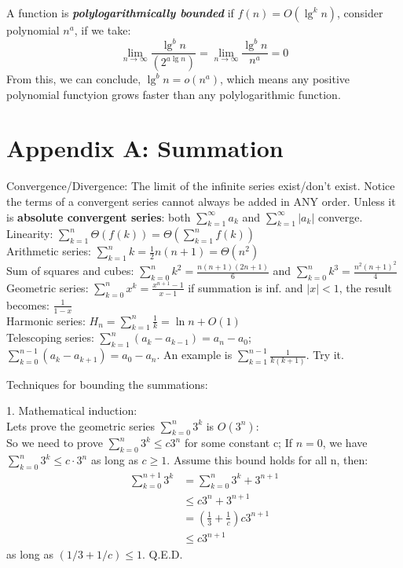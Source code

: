 \documentclass{article}
\begin{document}
A function is \textbf{\textit{polylogarithmically bounded}} if $f(n) = O(\lg^k n)$, consider polynomial $n^a$, if we take:
\[\lim_{n\to\infty}\frac{\lg^b n}{(2^{a\lg n})} = \lim_{n\to\infty}\frac{\lg^b n}{n^a} = 0\]
From this, we can conclude, $\lg^b n = o(n^a)$, which means any positive polynomial functyion grows faster than any polylogarithmic function.

\section*{Appendix A: Summation}
Convergence/Divergence: The limit of the infinite series exist/don't exist. Notice the terms of a convergent series cannot always be added in ANY order. 
Unless it is \textbf{absolute convergent series}: both $\sum_{k=1}^{\infty}a_k$ and $\sum_{k=1}^{\infty}|a_k|$ converge.\\

Linearity:  $\sum_{k=1}^{n}\Theta(f(k)) = \Theta(\sum_{k=1}^{n}f(k))$\\

Arithmetic series: $\sum_{k=1}^{n}k = \frac{1}{2} n(n+1) = \Theta(n^2)$\\

Sum of squares and cubes: $\sum_{k=0}^{n}k^2 = \frac{n(n+1)(2n+1)}{6}$ and $\sum_{k=0}^{n}k^3 = \frac{n^2(n+1)^2}{4}$\\

Geometric series: $\sum_{k=0}^{n}x^k = \frac{x^{n+1} -1}{x-1}$ if summation is inf. and $|x| < 1$, the result becomes: $\frac{1}{1-x}$\\

Harmonic series: $H_n = \sum_{k=1}^{n}\frac{1}{k} = \ln n + O(1)$\\

Telescoping series: $\sum_{k=1}^{n}(a_k -a_{k-1}) = a_n - a_0$; $\sum_{k=0}^{n-1}(a_k - a_{k+1}) = a_0 - a_n$. An example is $\sum_{k=1}^{n-1}\frac{1}{k(k+1)}$. Try it.

Techniques for bounding the summations:

1. Mathematical induction:\\
Lets prove the geometric series {\color{blue}$\sum_{k=0}^n 3^k$ is $O(3^n)$}:\\
So we need to prove {\color{blue}$\sum_{k=0}^n 3^k \leq c3^n$} for some constant c; If $n=0$, we have {\color{darkgreen}$\sum_{k=0}^n 3^k \leq c \cdot 3^n$} as long as $c\geq 1$. {\color{darkgreen} Assume this bound holds for all n}, then:
\begin{align*}
    \sum_{k=0}^{n+1} 3^{k} &=\sum_{k=0}^{n} 3^{k}+3^{n+1} \\
    & \leq c 3^{n}+3^{n+1} \\
    &=\left(\frac{1}{3}+\frac{1}{c}\right) c 3^{n+1} \\
    & \leq c 3^{n+1}
\end{align*}
as long as $(1/3 +1/c) \leq 1$. Q.E.D.\\
\end{document}
